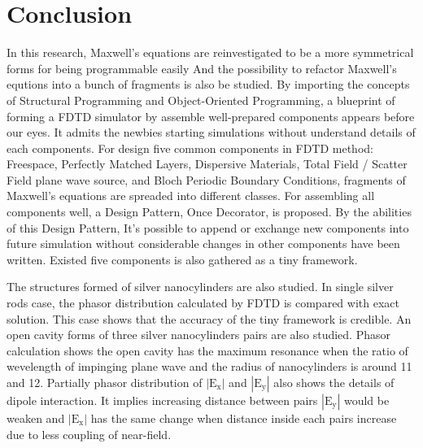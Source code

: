 \documentclass[openany]{book}
\begin{document}
\chapter{Conclusion}
In this research, Maxwell's equations are reinvestigated to be a more symmetrical forms for being programmable easily
And the possibility to refactor Maxwell's equtions into a bunch of fragments is also be studied. By importing the
concepts of Structural Programming and Object-Oriented Programming, a blueprint of forming a FDTD simulator by assemble
well-prepared components appears before our eyes. It admits the newbies starting simulations without understand details
of each components. For design five common components in FDTD method: Freespace, Perfectly Matched Layers, Dispersive
Materials, Total Field / Scatter Field plane wave source, and Bloch Periodic Boundary Conditions, fragments of Maxwell's
equations are spreaded into different classes. For assembling all components well, a Design Pattern, Once Decorator, is
proposed. By the abilities of this Design Pattern, It's possible to append or exchange new components into future
simulation without considerable changes in other components have been written. Existed five components is also gathered
as a tiny framework.

The structures formed of silver nanocylinders are also studied. In single silver rods case, the phasor distribution
calculated by FDTD is compared with exact solution. This case shows that the accuracy of the tiny framework is
credible. An open cavity forms of three silver nanocylinders pairs are also studied. Phasor calculation shows the open
cavity has the maximum resonance when the ratio of wevelength of impinging plane wave and the radius of nanocylinders is
around 11 and 12. Partially phasor distribution of $|\mathrm{E_x}|$ and $|\mathrm{E_y}|$ also shows the details of
dipole interaction. It implies increasing distance between pairs $|\mathrm{E_y}|$ would be weaken and $|\mathrm{E_x}|$
has the same change when distance inside each pairs increase due to less coupling of near-field.






\backmatter

\end{document}
